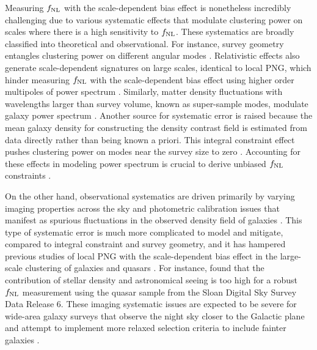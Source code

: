 Measuring $f_{\rm NL}$ with the scale-dependent bias effect is nonetheless incredibly challenging due to various systematic effects that modulate clustering power on scales where there is a high sensitivity to $f_{\rm NL}$. These systematics are broadly classified into theoretical and observational. For instance, survey geometry entangles clustering power on different angular modes \citep{beutler2014clustering,wilson2017rapid}. Relativistic effects also generate scale-dependent signatures on large scales, identical to local PNG, which hinder measuring $f_{\rm NL}$ with the scale-dependent bias effect using higher order multipoles of power spectrum \citep{wang2020}. Similarly, matter density fluctuations with wavelengths larger than survey volume, known as super-sample modes, modulate galaxy power spectrum \citep{castorina2020JCAP}. Another source for systematic error is raised because the mean galaxy density for constructing the density contrast field is estimated from data directly rather than being known a priori. This integral constraint effect pushes clustering power on modes near the survey size to zero \citep{peacock1991large,de2019integral}. Accounting for these effects in modeling power spectrum is crucial to derive unbiased $f_{\rm NL}$ constraints \citep[see, e.g.,][]{riquelme2022primordial}. 

On the other hand, observational systematics are driven primarily by varying imaging properties across the sky \citep{ross2011} and photometric calibration issues that manifest as spurious fluctuations in the observed density field of galaxies \citep{huterer2013calibration}. This type of systematic error is much more complicated to model and mitigate, compared to integral constraint and survey geometry, and it has hampered previous studies of local PNG with the scale-dependent bias effect in the large-scale clustering of galaxies and quasars \citep[see, e.g.,][]{Ho2015JCAP...05..040H}. For instance, \cite{pullen2013systematic} found that the contribution of stellar density and astronomical seeing is too high for a robust $f_{\rm NL}$ measurement using the quasar sample from the Sloan Digital Sky Survey Data Release 6. These imaging systematic issues are expected to be severe for wide-area galaxy surveys that observe the night sky closer to the Galactic plane and attempt to implement more relaxed selection criteria to include fainter galaxies \citep[see, e.g,][]{kitanidis2020imaging}. 

